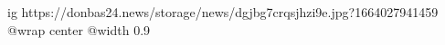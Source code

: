  
 
 
 
 

\ifcmt
  ig https://donbas24.news/storage/news/dgjbg7crqsjhzi9e.jpg?1664027941459
  @wrap center
  @width 0.9
\fi
